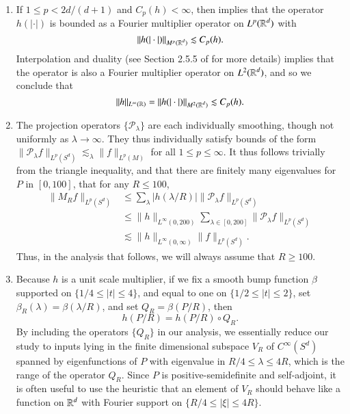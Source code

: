 \begin{remarks}
    \ 
\begin{enumerate}
    \item If $1 \leq p < 2d/(d+1)$ and $C_p(h) < \infty$, then \cite{HeoandNazarovandSeeger} implies that the operator $h(|\cdot|)$ is bounded as a Fourier multiplier operator on $L^p(\operatorname{\mathbb{R}}^d)$ with
    \[ \| h(|\cdot|) \|_{M^p(\operatorname{\mathbb{R}}^d)} \lesssim C_p(h). \]
    Interpolation and duality (see Section 2.5.5 of \cite{Grafakos} for more details) implies that the operator is also a Fourier multiplier operator on $L^2(\operatorname{\mathbb{R}}^d)$, and so we conclude that
    \[ \| h \|_{L^\infty(\operatorname{\mathbb{R}})} = \| h( |\cdot| ) \|_{M^2(\operatorname{\mathbb{R}}^d)} \lesssim C_p(h). \]

    \item The projection operators $\{ \mathcal{P}_\lambda \}$ are each individually smoothing, though not uniformly as $\lambda \to \infty$. They thus individually satisfy bounds of the form $\| \mathcal{P}_\lambda f \|_{L^p(S^d)} \lesssim_\lambda \| f \|_{L^p(M)}$ for all $1 \leq p \leq \infty$. It thus follows trivially from the triangle inequality, and that there are finitely many eigenvalues for $P$ in $[0,100]$, that for any $R \leq 100$,
    \begin{align*}
        \| M_R f \|_{L^p(S^d)} &\leq \sum_\lambda |h(\lambda/R)| \| \mathcal{P}_\lambda f \|_{L^p(S^d)}\\
        &\leq \| h \|_{L^\infty(0,200)} \sum\nolimits_{\lambda \in [0,200]} \| \mathcal{P}_\lambda f \|_{L^p(S^d)}\\
        &\lesssim \| h \|_{L^\infty(0,\infty)} \| f \|_{L^p(S^d)}.
    \end{align*}
    Thus, in the analysis that follows, we will always assume that $R \geq 100$.

    \item Because $h$ is a unit scale multiplier, if we fix a smooth bump function $\beta$ supported on $\{ 1/4 \leq |t| \leq 4 \}$, and equal to one on $\{ 1/2 \leq |t| \leq 2 \}$, set $\beta_R(\lambda) = \beta(\lambda / R)$, and set $Q_R = \beta(P/R)$, then
    \[ h(P/R) = h(P/R) \circ Q_R. \]
    By including the operators $\{ Q_R \}$ in our analysis, we essentially reduce our study to inputs lying in the finite dimensional subspace $V_R$ of $C^\infty(S^d)$ spanned by eigenfunctions of $P$ with eigenvalue in $R/4 \leq \lambda \leq 4R$, which is the range of the operator $Q_R$. Since $P$ is positive-semidefinite and self-adjoint, it is often useful to use the heuristic that an element of $V_R$ should behave like a function on $\operatorname{\mathbb{R}}^d$ with Fourier support on $\{ R/4 \leq |\xi| \leq 4R \}$.


\end{enumerate}
\end{remarks}

